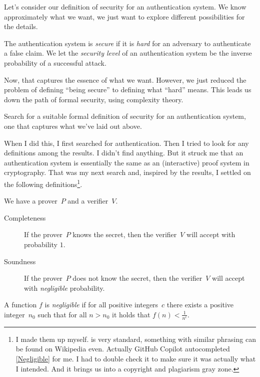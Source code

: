 Let's consider our definition of security for an authentication system.
We know approximately what we want, we just want to explore different 
possibilities for the details.

\begin{frame}
\begin{definition}
  The authentication system is \emph{secure} if it is \emph{hard} for an 
  adversary to authenticate a false claim.
  We let the \emph{security level} of an authentication system be the inverse 
  probability of a successful attack.
\end{definition}
\end{frame}

Now, that captures the essence of what we want.
However, we just reduced the problem of defining \enquote{being secure} to 
defining what \enquote{hard} means.
This leads us down the path of formal security, \eg using complexity theory.

\begin{exercise}
  Search for a suitable formal definition of security for an authentication 
  system, one that captures what we've laid out above.
\end{exercise}

When I did this, I first searched for authentication.
Then I tried to look for any definitions among the results.
I didn't find anything.
But it struck me that an authentication system is essentially the same as an 
(interactive) proof system in cryptography.
That was my next search and, inspired by the results, I settled on the 
following definitions\footnote{%
   I made them up myself.
   is very standard, something with similar phrasing can be 
  found on Wikipedia even.
  Actually GitHub Copilot autocompleted \cref{Negligible} for me.
  I had to double check it to make sure it was actually what I intended.
  And it brings us into a copyright and plagiarism gray zone.
}.

\begin{frame}
\begin{definition}\label{FormalSecurity}
  We have a prover~\(P\) and a verifier~\(V\).
  \begin{description}
    \item[Completeness] If the prover~\(P\) knows the secret, then the 
      verifier~\(V\) will accept with probability \(1\).
    \item[Soundness] If the prover~\(P\) does not know the secret, then the 
      verifier~\(V\) will accept with \emph{negligible} probability.
  \end{description}
\end{definition}

\begin{definition}[Negligible]\label{Negligible}
  A function \(f\) is \emph{negligible} if for all positive integers~\(c\) 
  there exists a positive integer~\(n_0\) such that for all \(n > n_0\) it 
  holds that \(f(n) < \frac{1}{n^c}\).
\end{definition}
\end{frame}

